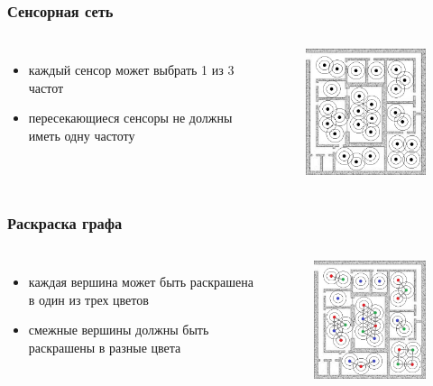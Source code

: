 \documentclass{beamer}
\begin{document}
\begin{frame}
  \frametitle{Сенсорная сеть}
  \begin{columns}[c]
    \begin{itemize}
      \item каждый сенсор может выбрать 1 из 3 частот
      \item пересекающиеся сенсоры не должны иметь одну частоту
    \end{itemize}

    \begin{figure}
       \includegraphics[width=5cm]{images/sensors.jpg}
    \end{figure}
  \end{columns}
\end{frame}

\begin{frame}
  \frametitle{Раскраска графа}
  \begin{columns}[c]
    \begin{itemize}
      \item каждая вершина может быть раскрашена в один из трех цветов
      \item смежные вершины должны быть раскрашены в разные цвета
    \end{itemize}

    \begin{figure}
       \includegraphics[width=5cm]{images/graph-coloring.jpg}
    \end{figure}
  \end{columns}
\end{frame}
\end{document}
